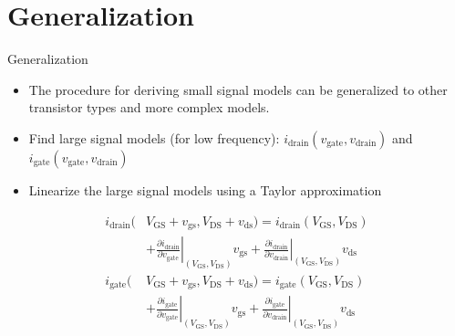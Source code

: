 \section{Generalization}
\begin{frame}{Generalization}
    \begin{itemize}
        \item The procedure for deriving small signal models can be generalized to other 
        transistor types and more complex models.
        \item Find large signal models (for low frequency): 
        $i_{\mathrm{drain}}(v_{\mathrm{gate}}, v_{\mathrm{drain}})$ and 
        $i_{\mathrm{gate}}(v_{\mathrm{gate}}, v_{\mathrm{drain}})$
        \item Linearize the large signal models using a Taylor approximation
    \end{itemize}
    \begin{align}
        i_{\mathrm{drain}}(&V_{\mathrm{GS}}+v_{\mathrm{gs}},
        V_{\mathrm{DS}}+v_{\mathrm{ds}})=i_{\mathrm{drain}}
        (V_{\mathrm{GS}},V_{\mathrm{DS}}) \\
        &+\left.\frac{\partial i_{\mathrm{drain}}}{\partial v_{\mathrm{gate}}}\right|
        _{(V_{\mathrm{GS}},V_{\mathrm{DS}})} v_{\mathrm{gs}} 
        + \left. \frac{\partial i_{\mathrm{drain}}}{\partial v_{\mathrm{drain}}} \right|
        _{(V_{\mathrm{GS}},V_{\mathrm{DS}})} v_{\mathrm{ds}} \\
        i_\mathrm{gate}(&V_{\mathrm{GS}}+v_{\mathrm{gs}},
        V_{\mathrm{DS}}+v_{\mathrm{ds}})=i_{\mathrm{gate}}
        (V_{\mathrm{GS}},V_{\mathrm{DS}}) \\
        &+\left.\frac{\partial i_\mathrm{gate}}{\partial v_{\mathrm{gate}}}\right|
        _{(V_{\mathrm{GS}},V_{\mathrm{DS}})} v_{\mathrm{gs}} 
        + \left. \frac{\partial i_\mathrm{gate}}{\partial v_{\mathrm{drain}}} \right|
        _{(V_{\mathrm{GS}},V_{\mathrm{DS}})} v_{\mathrm{ds}}
    \end{align}
\end{frame}